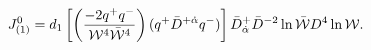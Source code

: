 \begin{equation}\label{complement_d1}
J_{(1)}^{0}= d_1 \left[\left({-2q^{+}q^{-}\over {\cal W}^4 \bar{\cal W}^4}\right)
(q^{+}\bar{D}^{+\dot\alpha}q^{-})\right]\bar{D}^{+}_{\dot\alpha}\bar{D}^{-2}
\ln \bar{\cal W} D^4 \ln {\cal W}.
\end{equation}

